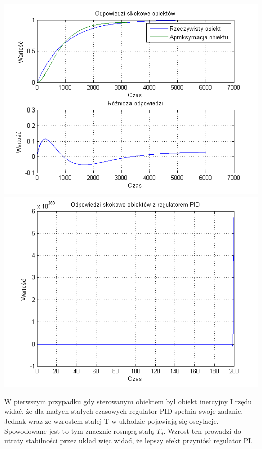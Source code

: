\documentclass[10pt,a4paper]{article}
\begin{document}
\begin{center}
\includegraphics[scale=1]{images/dwa/skrypt_41.png}\\
\includegraphics[scale=1]{images/dwa/skrypt_42.png}\\
\end{center}
\newpage

W pierwszym przypadku gdy sterowanym obiektem był obiekt inercyjny I rzędu widać, że dla małych stałych czasowych regulator PID spełnia swoje zadanie. Jednak wraz ze wzrostem stałej T w układzie pojawiają się oscylacje. Spowodowane jest to tym znacznie rosnącą stałą $T_d$. Wzrost ten prowadzi do utraty stabilności przez układ więc widać, że lepszy efekt przyniósł regulator PI. 
 
\end{document}
